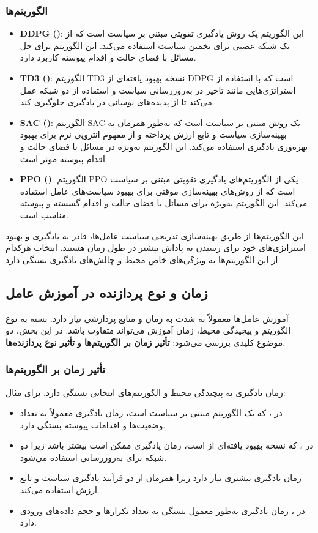 \subsubsection{الگوریتم‌ها}
\begin{itemize}
	\item \textbf{DDPG ()}: این الگوریتم یک روش یادگیری تقویتی مبتنی بر سیاست است که از یک شبکه عصبی برای تخمین سیاست استفاده می‌کند. این الگوریتم برای حل مسائل با فضای حالت و اقدام پیوسته کاربرد دارد.
	\item \textbf{TD3 ()}: الگوریتم TD3 نسخه بهبود یافته‌ای از DDPG است که با استفاده از استراتژی‌هایی مانند تاخیر در به‌روزرسانی سیاست و استفاده از دو شبکه عمل می‌کند تا از پدیده‌های نوسانی در یادگیری جلوگیری کند.
	\item \textbf{SAC ()}: الگوریتم SAC یک روش مبتنی بر سیاست است که به‌طور همزمان به بهینه‌سازی سیاست و تابع ارزش پرداخته و از مفهوم انتروپی نرم برای بهبود بهره‌وری یادگیری استفاده می‌کند. این الگوریتم به‌ویژه در مسائل با فضای حالت و اقدام پیوسته موثر است.
	\item \textbf{PPO ()}: الگوریتم PPO یکی از الگوریتم‌های یادگیری تقویتی مبتنی بر سیاست است که از روش‌های بهینه‌سازی موقتی برای بهبود سیاست‌های عامل استفاده می‌کند. این الگوریتم به‌ویژه برای مسائل با فضای حالت و اقدام گسسته و پیوسته مناسب است.
\end{itemize}

این الگوریتم‌ها از طریق بهینه‌سازی تدریجی سیاست عامل‌ها، قادر به یادگیری و بهبود استراتژی‌های خود برای رسیدن به پاداش بیشتر در طول زمان هستند. انتخاب هرکدام از این الگوریتم‌ها به ویژگی‌های خاص محیط و چالش‌های یادگیری بستگی دارد.

\subsection{زمان و نوع پردازنده در آموزش عامل}
آموزش عامل‌ها معمولاً به شدت به زمان و منابع پردازشی نیاز دارد. بسته به نوع الگوریتم و پیچیدگی محیط، زمان آموزش می‌تواند متفاوت باشد. در این بخش، دو موضوع کلیدی بررسی می‌شود: \textbf{تأثیر زمان بر الگوریتم‌ها} و \textbf{تأثیر نوع پردازنده‌ها}.

\subsubsection{تأثیر زمان بر الگوریتم‌ها}
زمان یادگیری به پیچیدگی محیط و الگوریتم‌های انتخابی بستگی دارد. برای مثال:
\begin{itemize}
	\item در ، که یک الگوریتم مبتنی بر سیاست است، زمان یادگیری معمولاً به تعداد وضعیت‌ها و اقدامات پیوسته بستگی دارد.
	\item در ، که نسخه بهبود یافته‌ای از  است، زمان یادگیری ممکن است بیشتر باشد زیرا دو شبکه برای به‌روزرسانی استفاده می‌شود.
	\item {} زمان یادگیری بیشتری نیاز دارد زیرا همزمان از دو فرآیند یادگیری سیاست و تابع ارزش استفاده می‌کند.
	\item در ، زمان یادگیری به‌طور معمول بستگی به تعداد تکرارها و حجم داده‌های ورودی دارد.
\end{itemize}

